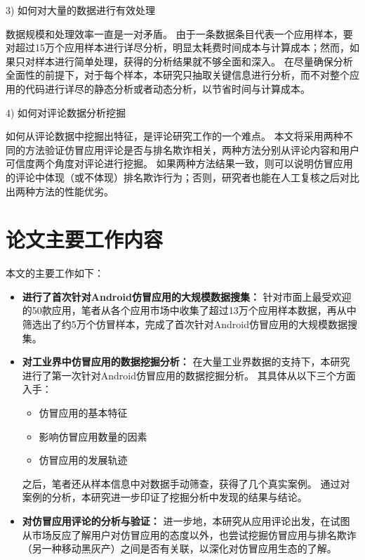 3)	如何对大量的数据进行有效处理

数据规模和处理效率一直是一对矛盾。
由于一条数据条目代表一个应用样本，要对超过15万个应用样本进行详尽分析，明显太耗费时间成本与计算成本；然而，如果只对样本进行简单处理，获得的分析结果就不够全面和深入。
在尽量确保分析全面性的前提下，对于每个样本，本研究只抽取关键信息进行分析，而不对整个应用的代码进行详尽的静态分析或者动态分析，以节省时间与计算成本。

4)  如何对评论数据分析挖掘

如何从评论数据中挖掘出特征，是评论研究工作的一个难点。
本文将采用两种不同的方法验证仿冒应用评论是否与排名欺诈相关，两种方法分别从评论内容和用户可信度两个角度对评论进行挖掘。
如果两种方法结果一致，则可以说明仿冒应用的评论中体现（或不体现）排名欺诈行为；否则，研究者也能在人工复核之后对比出两种方法的性能优劣。


\section{论文主要工作内容}
本文的主要工作如下：
\begin{itemize}
	\setlength{\itemsep}{1pt}
	\setlength{\parskip}{0pt}
	\setlength{\parsep}{0pt}

	\item{\bf 进行了首次针对Android仿冒应用的大规模数据搜集：}
	针对市面上最受欢迎的50款应用，笔者从各个应用市场中收集了超过13万个应用样本数据，再从中筛选出了约5万个仿冒样本，完成了首次针对Android仿冒应用的大规模数据搜集。

	\item{\bf 对工业界中仿冒应用的数据挖掘分析：}
	在大量工业界数据的支持下，本研究进行了第一次针对Android仿冒应用的数据挖掘分析。
	其具体从以下三个方面入手：
	\begin{itemize}
		\item 仿冒应用的基本特征
		\item 影响仿冒应用数量的因素
		\item 仿冒应用的发展轨迹
	\end{itemize}
	之后，笔者还从样本信息中对数据手动筛查，获得了几个真实案例。
	通过对案例的分析，本研究进一步印证了挖掘分析中发现的结果与结论。

	\item {\bf 对仿冒应用评论的分析与验证：}
	进一步地，本研究从应用评论出发，在试图从市场反应了解用户对仿冒应用的态度以外，也尝试挖掘仿冒应用与排名欺诈（另一种移动黑灰产）之间是否有关联，以深化对仿冒应用生态的了解。

\end{itemize}

